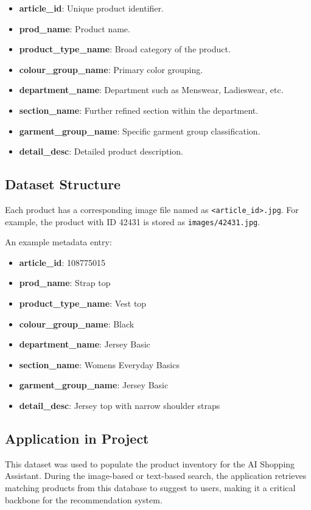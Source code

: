 \vspace{-1.25em}
\begin{itemize}
    \setlength\itemsep{-1.5em}
    \item \textbf{article\_id}: Unique product identifier.
    \item \textbf{prod\_name}: Product name.
    \item \textbf{product\_type\_name}: Broad category of the product.
    \item \textbf{colour\_group\_name}: Primary color grouping.
    \item \textbf{department\_name}: Department such as Menswear, Ladieswear, etc.
    \item \textbf{section\_name}: Further refined section within the department.
    \item \textbf{garment\_group\_name}: Specific garment group classification.
    \item \textbf{detail\_desc}: Detailed product description.
\end{itemize}

\subsection{Dataset Structure}

Each product has a corresponding image file named as \texttt{<article\_id>.jpg}. For example, the product with ID 42431 is stored as \texttt{images/42431.jpg}.

An example metadata entry:

\vspace{-1.25em}
\begin{itemize}
    \setlength\itemsep{-1.5em}
    \item \textbf{article\_id}: 108775015
    \item \textbf{prod\_name}: Strap top
    \item \textbf{product\_type\_name}: Vest top
    \item \textbf{colour\_group\_name}: Black
    \item \textbf{department\_name}: Jersey Basic
    \item \textbf{section\_name}: Womens Everyday Basics
    \item \textbf{garment\_group\_name}: Jersey Basic
    \item \textbf{detail\_desc}: Jersey top with narrow shoulder straps
\end{itemize}

\subsection{Application in Project}

This dataset was used to populate the product inventory for the AI Shopping Assistant. During the image-based or text-based search, the application retrieves matching products from this database to suggest to users, making it a critical backbone for the recommendation system.